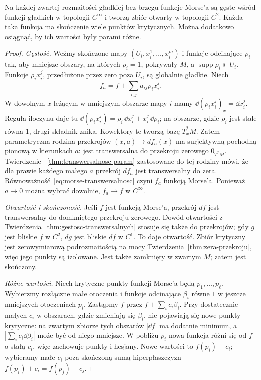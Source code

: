 \begin{twierdzenie}
\label{thm:gestosc-morse}
Na każdej zwartej rozmaitości gładkiej
bez brzegu funkcje Morse'a są gęste wśród
funkcji gładkich w topologii $C^\infty$
i tworzą zbiór otwarty w topologii $C^2$.
Każda taka funkcja ma skończenie wiele
punktów krytycznych. Można dodatkowo
osiągnąć, by ich wartości były parami różne.
\end{twierdzenie}
\begin{proof}
\emph{Gęstość.}
Weźmy skończone mapy $(U_i,x_i^1,\ldots,x_i^m)$
i funkcje odcinające $\rho_i$ tak, aby mniejsze
obszary, na których $\rho_i=1$, pokrywały $M$,
a $\operatorname{supp}\rho_i\Subset U_i$.
Funkcje $\rho_i x_i^j$, przedłużone przez
zero poza $U_i$, są globalnie gładkie.
Niech
\[
 f_a=f+\sum_{i,j}a_{ij}\rho_i x_i^j.
\]
W dowolnym $x$ leżącym w mniejszym obszarze
mapy $i$ mamy
$\dd(\rho_i x_i^j)_x=\dd x_i^j$.
Reguła iloczynu daje tu
$\dd(\rho_i x_i^j)=\rho_i\,\dd x_i^j+x_i^j\,\dd\rho_i$;
na obszarze, gdzie $\rho_i$ jest stale równa $1$,
drugi składnik znika.
Kowektory te tworzą bazę $T_x^*M$.
Zatem parametryczna rodzina przekrojów
$(x,a)\mapsto df_a(x)$ ma surjektywną
pochodną pionową w kierunkach $a$:
jest transwersalna do przekroju zerowego
$0_{T^*M}$. Twierdzenie
~\ref{thm:transwersalnosc-param}
zastosowane do tej rodziny mówi, że
dla prawie każdego małego $a$ przekrój
$df_a$ jest transwersalny do zera.
Równoważność~\eqref{eq:morse-transwersalnosc}
czyni $f_a$ funkcją Morse'a. Ponieważ
$a\to0$ można wybrać dowolnie,
$f_a\to f$ w $C^\infty$.

\emph{Otwartość i skończoność.}
Jeśli $f$ jest funkcją Morse'a, przekrój $df$
jest transwersalny do domkniętego
przekroju zerowego. Dowód otwartości
z Twierdzenia~\ref{thm:gestosc-transwersalnych}
stosuje się także do przekrojów;
gdy $g$ jest bliskie $f$ w $C^2$,
$dg$ jest bliskie $df$ w $C^1$.
To daje otwartość. Zbiór krytyczny
jest zerowymiarową podrozmaitością
na mocy Twierdzenia~\ref{thm:zera-przekroju},
więc jego punkty są izolowane.
Jest także zamknięty w zwartym $M$;
zatem jest skończony.

\emph{Różne wartości.}
Niech krytyczne punkty funkcji Morse'a
będą $p_1,\ldots,p_\ell$. Wybierzmy
rozłączne małe otoczenia i funkcje
odcinające $\beta_i$ równe $1$ w jeszcze
mniejszych otoczeniach $p_i$.
Zastąpmy $f$ przez
$f+\sum_i c_i\beta_i$.
Przy dostatecznie małych $c_i$ w obszarach,
gdzie zmieniają się $\beta_i$, nie pojawiają
się nowe punkty krytyczne: na zwartym
zbiorze tych obszarów $|\dd f|$ ma dodatnie
minimum, a $|\sum_i c_i\dd\beta_i|$ może
być od niego mniejsze. W pobliżu $p_i$
nowa funkcja różni się od $f$ o stałą
$c_i$, więc zachowuje punkty i hesjany.
Nowe wartości to $f(p_i)+c_i$; wybieramy
małe $c_i$ poza skończoną sumą hiperpłaszczyzn
$f(p_i)+c_i=f(p_j)+c_j$.
\end{proof}

